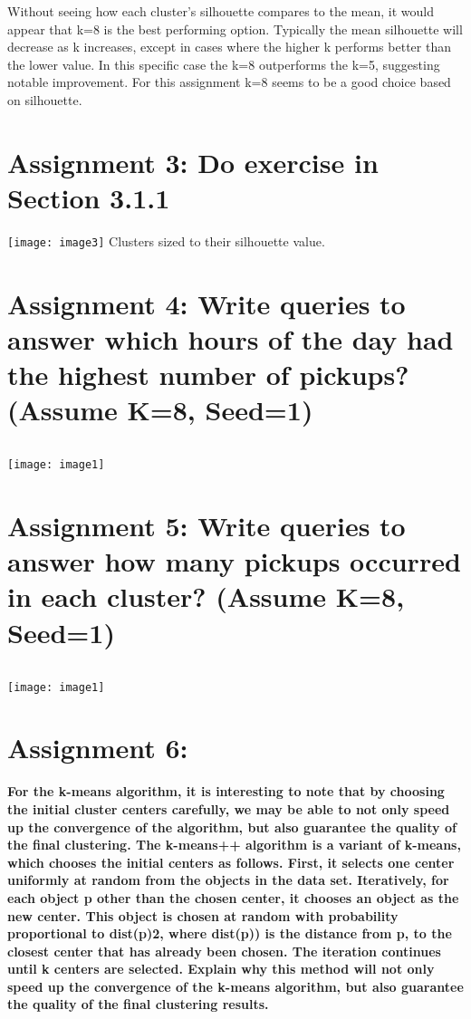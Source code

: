 \documentclass[]{article}
\begin{document}
Without seeing how each cluster's silhouette compares to the mean, it would appear that k=8 is the best performing option. 
Typically the mean silhouette will decrease as k increases, except in cases where the higher k performs better than the lower value. 
In this specific case the k=8 outperforms the k=5, suggesting notable improvement.
For this assignment k=8 seems to be a good choice based on silhouette.

\section*{Assignment 3: Do exercise in Section 3.1.1}

\texttt{[image: image3]}
Clusters sized to their silhouette value.

\section*{Assignment 4: Write queries to answer which hours of the day had the highest number of pickups? (Assume K=8, Seed=1)}

\begin{verbatim}

\end{verbatim}
\texttt{[image: image1]}

\section*{Assignment 5: Write queries to answer how many pickups occurred in each cluster? (Assume K=8, Seed=1)}

\begin{verbatim}

\end{verbatim}
\texttt{[image: image1]}

\section*{Assignment 6:}
\textbf{
For the k-means algorithm, it is interesting to note that by choosing the initial cluster centers 
carefully, we may be able to not only speed up the convergence of the algorithm, but also 
guarantee the quality of the final clustering. The k-means++ algorithm is a variant of k-means, 
which chooses the initial centers as follows. First, it selects one center uniformly at random from 
the objects in the data set. Iteratively, for each object p other than the chosen center, it chooses 
an object as the new center. This object is chosen at random with probability proportional to 
dist(p)2, where dist(p)) is the distance from p, to the closest center that has already been chosen. 
The iteration continues until k centers are selected.
Explain why this method will not only speed up the convergence of the k-means algorithm, but 
also guarantee the quality of the final clustering results.
}
\end{document}
